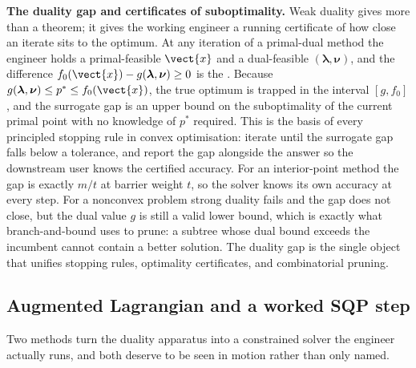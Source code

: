 \begin{mastery}
\textbf{The duality gap and certificates of suboptimality.} Weak
duality gives more than a theorem; it gives the working engineer a
running certificate of how close an iterate sits to the optimum.
At any iteration of a primal-dual method the engineer holds a
primal-feasible $\vect{x}$ and a dual-feasible $(\boldsymbol{\lambda},
\boldsymbol{\nu})$, and the difference $f_{0}(\vect{x}) -
g(\boldsymbol{\lambda}, \boldsymbol{\nu}) \geq 0$ is the
. Because $g(\boldsymbol{\lambda},
\boldsymbol{\nu}) \leq p^{*} \leq f_{0}(\vect{x})$, the true
optimum is trapped in the interval $[g, f_{0}]$, and the surrogate
gap is an upper bound on the suboptimality of the current primal
point with no knowledge of $p^{*}$ required. This is the basis of
every principled stopping rule in convex optimisation: iterate
until the surrogate gap falls below a tolerance, and report the
gap alongside the answer so the downstream user knows the certified
accuracy. For an interior-point method the gap is exactly $m/t$ at
barrier weight $t$, so the solver knows its own accuracy at every
step. For a nonconvex problem strong duality fails and the gap does
not close, but the dual value $g$ is still a valid lower bound,
which is exactly what branch-and-bound uses to prune: a subtree
whose dual bound exceeds the incumbent cannot contain a better
solution. The duality gap is the single object that unifies
stopping rules, optimality certificates, and combinatorial pruning.
\end{mastery}

\subsection{Augmented Lagrangian and a worked SQP step}

Two methods turn the duality apparatus into a constrained solver
the engineer actually runs, and both deserve to be seen in motion
rather than only named.

